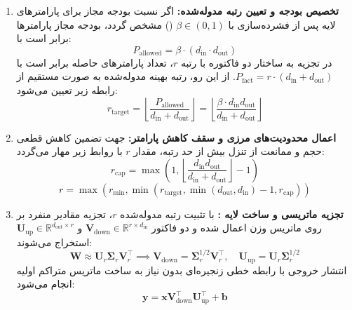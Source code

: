 \begin{enumerate}
    \item \textbf{تخصیص بودجه و تعیین رتبه مدوله‌شده:}
    اگر نسبت بودجه مجاز برای پارامترهای لایه پس از فشرده‌سازی با $\beta \in (0, 1)$ () مشخص گردد، بودجه مجاز پارامترها برابر است با:
    \begin{equation}
    P_{\text{allowed}} = \beta \cdot (d_{\text{in}} \cdot d_{\text{out}})
    \end{equation}
    در تجزیه به ساختار دو فاکتوره با رتبه $r$، تعداد پارامترهای حاصله برابر است با $P_{\text{fact}} = r \cdot (d_{\text{in}} + d_{\text{out}})$. از این رو، رتبه بهینه مدوله‌شده به صورت مستقیم از رابطه زیر تعیین می‌شود:
    \begin{equation}
    r_{\text{target}} = \left\lfloor \frac{P_{\text{allowed}}}{d_{\text{in}} + d_{\text{out}}} \right\rfloor = \left\lfloor \frac{\beta \cdot d_{\text{in}} d_{\text{out}}}{d_{\text{in}} + d_{\text{out}}} \right\rfloor
    \end{equation}

    \item \textbf{اعمال محدودیت‌های مرزی و سقف کاهش پارامتر:}
    جهت تضمین کاهش قطعی حجم و ممانعت از تنزل بیش از حد رتبه، مقدار $r$ با روابط زیر مهار می‌گردد:
    \begin{equation}
    r_{\text{cap}} = \max\left(1, \left\lfloor \frac{d_{\text{in}} d_{\text{out}}}{d_{\text{in}} + d_{\text{out}}} \right\rfloor - 1\right)
    \end{equation}
    \begin{equation}
    r = \max\left(r_{\text{min}}, \min\left(r_{\text{target}}, \min(d_{\text{out}}, d_{\text{in}}) - 1, r_{\text{cap}}\right)\right)
    \end{equation}

    \item \textbf{تجزیه ماتریسی و ساخت لایه :}
    با تثبیت رتبه مدوله‌شده $r$، تجزیه مقادیر منفرد بر روی ماتریس وزن اعمال شده و دو فاکتور $\mathbf{V}_{\text{down}} \in \mathbb{R}^{r \times d_{\text{in}}}$ و $\mathbf{U}_{\text{up}} \in \mathbb{R}^{d_{\text{out}} \times r}$ استخراج می‌شوند:
    \begin{equation}
    \mathbf{W} \approx \mathbf{U}_r \mathbf{\Sigma}_r \mathbf{V}_r^\top \implies \mathbf{V}_{\text{down}} = \mathbf{\Sigma}_r^{1/2} \mathbf{V}_r^\top, \quad \mathbf{U}_{\text{up}} = \mathbf{U}_r \mathbf{\Sigma}_r^{1/2}
    \end{equation}
    انتشار خروجی با رابطه خطی زنجیره‌ای بدون نیاز به ساخت ماتریس متراکم اولیه انجام می‌شود:
    \begin{equation}
    \mathbf{y} = \mathbf{x} \mathbf{V}_{\text{down}}^\top \mathbf{U}_{\text{up}}^\top + \mathbf{b}
    \end{equation}
\end{enumerate}

